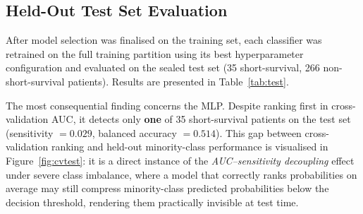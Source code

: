 \documentclass[a4paper,twoside]{article}
\begin{document}
\subsection{Held-Out Test Set Evaluation}

After model selection was finalised on the training set, each classifier was
retrained on the full training partition using its best hyperparameter
configuration and evaluated on the sealed test set (35 short-survival,
266 non-short-survival patients). Results are presented in Table~\ref{tab:test}.

\begin{table}[ht!]
  \centering
  \caption{Held-out test set performance for each classifier under its best
    cross-validation configuration. Bold indicates the best value per metric.}
  \label{tab:test}
\end{table}

The most consequential finding concerns the MLP. Despite ranking first in
cross-validation AUC, it detects only \textbf{one} of 35 short-survival patients
on the test set (sensitivity $= 0.029$, balanced accuracy $= 0.514$). This gap
between cross-validation ranking and held-out minority-class performance is
visualised in Figure~\ref{fig:cvtest}: it is a direct instance of the
\emph{AUC--sensitivity decoupling} effect under severe class imbalance, where a
model that correctly ranks probabilities on average may still compress
minority-class predicted probabilities below the decision threshold, rendering
them practically invisible at test time.
\end{document}
